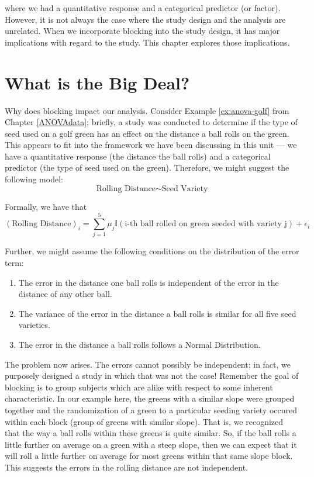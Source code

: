 \documentclass[]{book}
\providecommand{\tightlist}{%
  \setlength{\itemsep}{0pt}\setlength{\parskip}{0pt}}
\theoremstyle{definition}
\theoremstyle{definition}
\theoremstyle{definition}
\theoremstyle{remark}
\begin{document}
where we had a quantitative response and a categorical predictor (or
factor). However, it is not always the case where the study design and
the analysis are unrelated. When we incorporate blocking into the study
design, it has major implications with regard to the study. This chapter
explores those implications.

\section{What is the Big Deal?}\label{what-is-the-big-deal}

Why does blocking impact our analysis. Consider Example
\ref{ex:anova-golf} from Chapter \ref{ANOVAdata}; briefly, a study was
conducted to determine if the type of seed used on a golf green has an
effect on the distance a ball rolls on the green. This appears to fit
into the framework we have been discussing in this unit --- we have a
quantitative response (the distance the ball rolls) and a categorical
predictor (the type of seed used on the green). Therefore, we might
suggest the following model:
\[\text{Rolling Distance} \sim \text{Seed Variety}\]

Formally, we have that
\[(\text{Rolling Distance})_i = \sum_{j=1}^{5} \mu_j \mathbb{I}(\text{i-th ball rolled on green seeded with variety j}) + \epsilon_i\]

Further, we might assume the following conditions on the distribution of
the error term:

\begin{enumerate}
\def\labelenumi{\arabic{enumi}.}
\tightlist
\item
  The error in the distance one ball rolls is independent of the error
  in the distance of any other ball.
\item
  The variance of the error in the distance a ball rolls is similar for
  all five seed varieties.
\item
  The error in the distance a ball rolls follows a Normal Distribution.
\end{enumerate}

The problem now arises. The errors cannot possibly be independent; in
fact, we purposely designed a study in which that was not the case!
Remember the goal of blocking is to group subjects which are alike with
respect to some inherent characteristic. In our example here, the greens
with a similar slope were grouped together and the randomization of a
green to a particular seeding variety occured within each block (group
of greens with similar slope). That is, we recognized that the way a
ball rolls within these greens is quite similar. So, if the ball rolls a
little further on average on a green with a steep slope, then we can
expect that it will roll a little further on average for most greens
within that same slope block. This suggests the errors in the rolling
distance are not independent.
\end{document}
